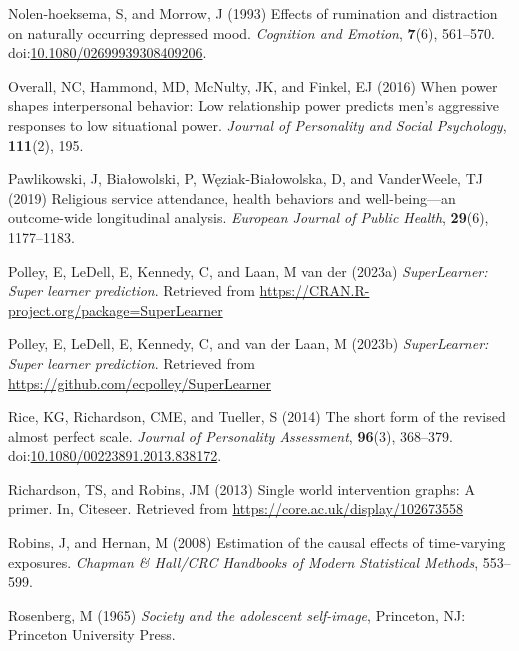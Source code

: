 \documentclass[
  single column]{article}
\newlength{\cslhangindent}
\newenvironment{CSLReferences}[2] %
 {\begin{list}{}{%
  \setlength{\itemindent}{0pt}
  \setlength{\leftmargin}{0pt}
  \setlength{\parsep}{0pt}
  \ifodd #1
   \setlength{\leftmargin}{\cslhangindent}
   \setlength{\itemindent}{-1\cslhangindent}
  \fi
  \setlength{\itemsep}{#2\baselineskip}}}
 {\end{list}}
\begin{document}
\begin{CSLReferences}{1}{0}
Nolen-hoeksema, S, and Morrow, J (1993) Effects of rumination and
distraction on naturally occurring depressed mood. \emph{Cognition and
Emotion}, \textbf{7}(6), 561--570.
doi:\href{https://doi.org/10.1080/02699939308409206}{10.1080/02699939308409206}.

Overall, NC, Hammond, MD, McNulty, JK, and Finkel, EJ (2016) When power
shapes interpersonal behavior: Low relationship power predicts men's
aggressive responses to low situational power. \emph{Journal of
Personality and Social Psychology}, \textbf{111}(2), 195.

Pawlikowski, J, Białowolski, P, Węziak-Białowolska, D, and VanderWeele,
TJ (2019) Religious service attendance, health behaviors and
well-being---an outcome-wide longitudinal analysis. \emph{European
Journal of Public Health}, \textbf{29}(6), 1177--1183.

Polley, E, LeDell, E, Kennedy, C, and Laan, M van der (2023a)
\emph{SuperLearner: Super learner prediction}. Retrieved from
\url{https://CRAN.R-project.org/package=SuperLearner}

Polley, E, LeDell, E, Kennedy, C, and van der Laan, M (2023b)
\emph{SuperLearner: Super learner prediction}. Retrieved from
\url{https://github.com/ecpolley/SuperLearner}

Rice, KG, Richardson, CME, and Tueller, S (2014) The short form of the
revised almost perfect scale. \emph{Journal of Personality Assessment},
\textbf{96}(3), 368--379.
doi:\href{https://doi.org/10.1080/00223891.2013.838172}{10.1080/00223891.2013.838172}.

Richardson, TS, and Robins, JM (2013) Single world intervention graphs:
A primer. In, Citeseer. Retrieved from
\url{https://core.ac.uk/display/102673558}

Robins, J, and Hernan, M (2008) Estimation of the causal effects of
time-varying exposures. \emph{Chapman \& Hall/CRC Handbooks of Modern
Statistical Methods}, 553--599.

Rosenberg, M (1965) \emph{Society and the adolescent self-image},
Princeton, NJ: Princeton University Press.


\end{CSLReferences}
\end{document}
